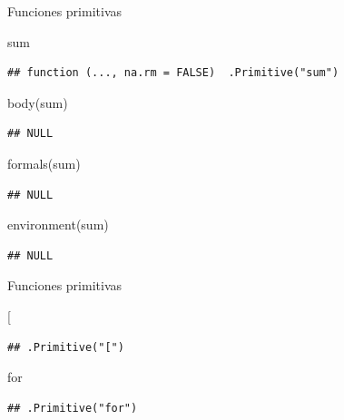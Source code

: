 \documentclass[
  ignorenonframetext,
]{beamer}
\newenvironment{Shaded}{\begin{snugshade}}{\end{snugshade}}
\newcommand{\AttributeTok}[1]{\textcolor[rgb]{0.77,0.63,0.00}{#1}}
\newcommand{\FunctionTok}[1]{\textcolor[rgb]{0.00,0.00,0.00}{#1}}
\newcommand{\NormalTok}[1]{#1}
\newcommand{\StringTok}[1]{\textcolor[rgb]{0.31,0.60,0.02}{#1}}
\begin{document}
\begin{frame}[fragile]{Funciones primitivas}
\protect\hypertarget{funciones-primitivas}{}
\begin{Shaded}
\begin{Highlighting}[]
\NormalTok{sum}
\end{Highlighting}
\end{Shaded}

\begin{verbatim}
## function (..., na.rm = FALSE)  .Primitive("sum")
\end{verbatim}

\begin{Shaded}
\begin{Highlighting}[]
\FunctionTok{body}\NormalTok{(sum)}
\end{Highlighting}
\end{Shaded}

\begin{verbatim}
## NULL
\end{verbatim}

\begin{Shaded}
\begin{Highlighting}[]
\FunctionTok{formals}\NormalTok{(sum)}
\end{Highlighting}
\end{Shaded}

\begin{verbatim}
## NULL
\end{verbatim}

\begin{Shaded}
\begin{Highlighting}[]
\FunctionTok{environment}\NormalTok{(sum)}
\end{Highlighting}
\end{Shaded}

\begin{verbatim}
## NULL
\end{verbatim}
\end{frame}

\begin{frame}[fragile]{Funciones primitivas}
\protect\hypertarget{funciones-primitivas-1}{}
\begin{Shaded}
\begin{Highlighting}[]
\StringTok{\textasciigrave{}}\AttributeTok{[}\StringTok{\textasciigrave{}}
\end{Highlighting}
\end{Shaded}

\begin{verbatim}
## .Primitive("[")
\end{verbatim}

\begin{Shaded}
\begin{Highlighting}[]
\StringTok{\textasciigrave{}}\AttributeTok{for}\StringTok{\textasciigrave{}}
\end{Highlighting}
\end{Shaded}

\begin{verbatim}
## .Primitive("for")
\end{verbatim}
\end{frame}
\end{document}
